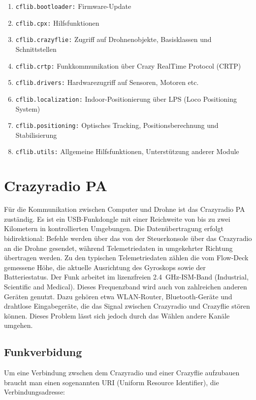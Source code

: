 \begin{enumerate}
    \item \texttt{cflib.bootloader:} Firmware-Update
    \item \texttt{cflib.cpx:} Hilfsfunktionen
    \item \texttt{cflib.crazyflie:} Zugriff auf Drohnenobjekte, Basisklassen und Schnittstellen
    \item \texttt{cflib.crtp:} Funkkommunikation über Crazy RealTime Protocol (CRTP)
    \item \texttt{cflib.drivers:} Hardwarezugriff auf Sensoren, Motoren etc.
    \item \texttt{cflib.localization:} Indoor-Positionierung über LPS (Loco Positioning System)
    \item \texttt{cflib.positioning:} Optisches Tracking, Positionsberechnung und Stabilisierung
    \item \texttt{cflib.utils:} Allgemeine Hilfsfunktionen, Unterstützung anderer Module
\end{enumerate}

\section{Crazyradio PA}
\label{sec:crpa}
Für die Kommunikation zwischen Computer und Drohne ist das Crazyradio PA zuständig.
Es ist ein USB-Funkdongle mit einer Reichweite von bis zu zwei Kilometern in kontrollierten Umgebungen.
Die Datenübertragung erfolgt bidirektional:
Befehle werden über das  von der Steuerkonsole über das Crazyradio an die Drohne gesendet, während Telemetriedaten in umgekehrter Richtung übertragen werden.
Zu den typischen Telemetriedaten zählen die vom Flow-Deck gemessene Höhe, die aktuelle Ausrichtung des Gyroskops sowie der Batteriestatus.
Der Funk arbeitet im lizenzfreien \SI{2.4}{\giga\hertz}-ISM-Band (Industrial, Scientific and Medical).
Dieses Frequenzband wird auch von zahlreichen anderen Geräten genutzt. Dazu gehören etwa WLAN-Router, Bluetooth-Geräte und drahtlose Eingabegeräte, die das Signal zwischen Crazyradio und Crazyflie stören können. Dieses Problem lässt sich jedoch durch das Wählen andere Kanäle umgehen. \cite{bc:crpa_conf}

\subsection{Funkverbidung}
Um eine Verbindung zwschen dem Crazyradio und einer Crazyflie aufzubauen braucht man einen sogenannten URI (Uniform Resource Identifier), die Verbindungsadresse:

